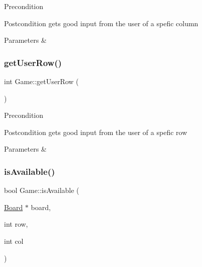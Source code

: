\begin{DoxyPrecond}{Precondition}

\end{DoxyPrecond}
\begin{DoxyPostcond}{Postcondition}
gets good input from the user of a spefic column 
\end{DoxyPostcond}

\begin{DoxyParams}{Parameters}
{\em } & \\
\hline
\end{DoxyParams}
\mbox{\label{classGame_aa70d12c53416ed809104a7bd8274953c}} 
\subsubsection{\texorpdfstring{get\+User\+Row()}{getUserRow()}}
{\footnotesize\ttfamily int Game\+::get\+User\+Row (\begin{DoxyParamCaption}{ }\end{DoxyParamCaption})}

\begin{DoxyPrecond}{Precondition}

\end{DoxyPrecond}
\begin{DoxyPostcond}{Postcondition}
gets good input from the user of a spefic row 
\end{DoxyPostcond}

\begin{DoxyParams}{Parameters}
{\em } & \\
\hline
\end{DoxyParams}
\mbox{\label{classGame_ac5375584508e57a7172388b1d60ab5db}} 
\subsubsection{\texorpdfstring{is\+Available()}{isAvailable()}}
{\footnotesize\ttfamily bool Game\+::is\+Available (\begin{DoxyParamCaption}\item[{\hyperlink{classBoard}{Board} $\ast$}]{board,  }\item[{int}]{row,  }\item[{int}]{col }\end{DoxyParamCaption})}

